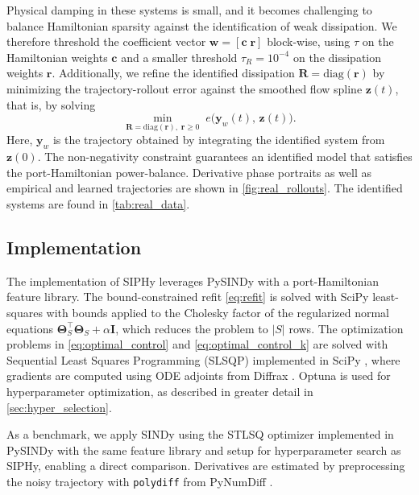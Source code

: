 \documentclass[11pt, a4paper]{article}
\theoremstyle{plain}
\theoremstyle{definition}
\theoremstyle{remark}
\begin{document}
Physical damping in these systems is small, and it becomes challenging to balance Hamiltonian sparsity against the identification of weak dissipation. We therefore threshold the coefficient vector $\mathbf{w}=[\mathbf{c}\;\mathbf{r}]$ block-wise, using $\tau$ on the Hamiltonian weights $\mathbf{c}$ and a smaller threshold $\tau_R =10^{-4}$ on the dissipation weights $\mathbf{r}$. Additionally, we refine the identified dissipation $\mathbf{R} = \mathrm{diag}(\mathbf{r})$ by minimizing the trajectory-rollout error
against the smoothed flow spline $\mathbf{z}(t)$, that is, by solving
\begin{equation*}
  \min_{\mathbf{R} = \mathrm{diag}(\mathbf{r}),\; \mathbf{r} \ge 0}
    \; e\big(\mathbf{y}_w(t),\, \mathbf{z}(t)\big).
    \label{eq:rollout_refine}
\end{equation*}
Here, $\mathbf{y}_w$ is the trajectory
obtained by integrating the identified system from $\mathbf{z}(0)$. The non-negativity
constraint guarantees an identified model that satisfies the port-Hamiltonian power-balance. Derivative phase portraits as well as empirical and learned trajectories are shown in \cref{fig:real_rollouts}. The identified systems are found in \cref{tab:real_data}.







\subsection{Implementation}


The implementation of SIPHy leverages PySINDy \cite{de2020pysindy} with a port-Hamiltonian feature library. The bound-constrained refit \eqref{eq:refit} is solved with SciPy \cite{virtanen2020scipy} least-squares with bounds applied to the Cholesky factor of the
regularized normal equations $\boldsymbol{\Theta}_S^\top\boldsymbol{\Theta}_S + \alpha \mathbf{I}$, which reduces the problem to $|S|$ rows. The optimization problems in \eqref{eq:optimal_control} and \eqref{eq:optimal_control_k} are solved with Sequential Least Squares Programming (SLSQP) implemented in SciPy \cite{virtanen2020scipy}, where gradients are computed using ODE adjoints from Diffrax \cite{kidger2022neural}. Optuna \cite{akiba2019optunanextgenerationhyperparameteroptimization} is used for hyperparameter optimization, as described in greater detail in \cref{sec:hyper_selection}.

As a benchmark, we apply SINDy \cite{brunton_discovering_2016} using the STLSQ optimizer implemented in PySINDy \cite{de2020pysindy} with the same feature library and setup for hyperparameter search as SIPHy, enabling a direct comparison. Derivatives are estimated by preprocessing the noisy trajectory with \texttt{polydiff} from PyNumDiff \cite{van_breugel_numerical_2020}.
\end{document}
